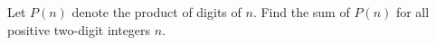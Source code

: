 Let $P(n)$ denote the product of digits of $n$. Find the sum of $P(n)$ for all positive two-digit integers $n$.
